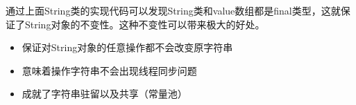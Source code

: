 通过上面String类的实现代码可以发现String类和value数组都是final类型，这就保证了String对象的不变性。这种不变性可以带来极大的好处。

\begin{itemize}
    \item 保证对String对象的任意操作都不会改变原字符串
    \item 意味着操作字符串不会出现线程同步问题
    \item 成就了字符串驻留以及共享（常量池）
\end{itemize}











































